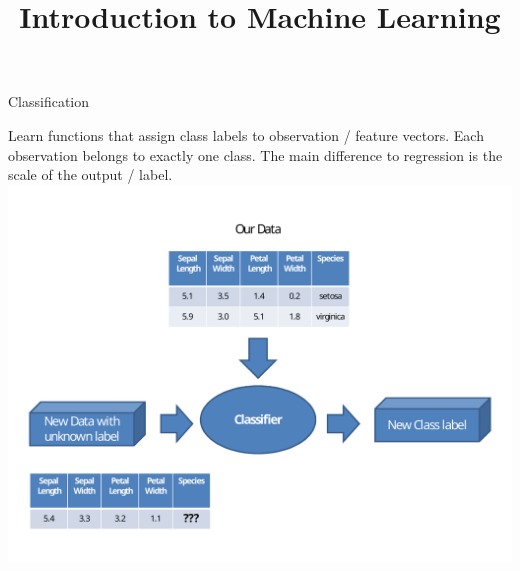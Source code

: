 \documentclass[11pt,compress,t,notes=noshow, xcolor=table]{beamer}
\title{Introduction to Machine Learning}
\institute{\href{https://compstat-lmu.github.io/lecture_i2ml/}{compstat-lmu.github.io/lecture\_i2ml}}
\date{}
\begin{document}

%
\begin{vbframe}{Classification}
%
%
%

Learn functions that assign class labels to observation / feature vectors. Each observation belongs to exactly one class. The main difference to regression is the scale of the output / label.
{\centering \includegraphics[width= .7\textwidth]{figure_man/classifier.pdf}}

\end{vbframe}
\end{document}
